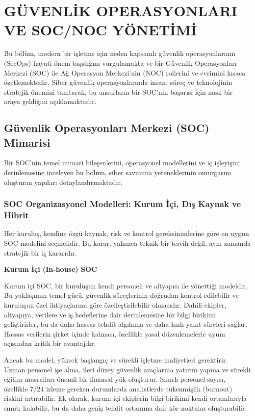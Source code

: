 \chapter{GÜVENLİK OPERASYONLARI VE SOC/NOC YÖNETİMİ}

Bu bölüm, modern bir işletme için neden kapsamlı güvenlik operasyonlarının (SecOps) hayati önem taşıdığını vurgulamakta ve bir Güvenlik Operasyonları Merkezi (SOC) ile Ağ Operasyon Merkezi'nin (NOC) rollerini ve evrimini kısaca özetlemektedir. Siber güvenlik operasyonlarında insan, süreç ve teknolojinin stratejik önemini tanıtarak, bu unsurların bir SOC'nin başarısı için nasıl bir araya geldiğini açıklamaktadır.

\section{Güvenlik Operasyonları Merkezi (SOC) Mimarisi}

Bir SOC'nin temel mimari bileşenlerini, operasyonel modellerini ve iç işleyişini derinlemesine inceleyen bu bölüm, siber savunma yeteneklerinin omurgasını oluşturan yapıları detaylandırmaktadır.

\subsection{SOC Organizasyonel Modelleri: Kurum İçi, Dış Kaynak ve Hibrit}

Her kuruluş, kendine özgü kaynak, risk ve kontrol gereksinimlerine göre en uygun SOC modelini seçmelidir. Bu karar, yalnızca teknik bir tercih değil, aynı zamanda stratejik bir iş kararıdır.

\textbf{Kurum İçi (In-house) SOC}

Kurum içi SOC, bir kuruluşun kendi personeli ve altyapısı ile yönettiği modeldir. Bu yaklaşımın temel gücü, güvenlik süreçlerinin doğrudan kontrol edilebilir ve kuruluşun özel ihtiyaçlarına göre özelleştirilebilir olmasıdır. Dahili ekipler, altyapıya, verilere ve iş hedeflerine dair derinlemesine bir bilgi birikimi geliştirirler, bu da daha hassas tehdit algılama ve daha hızlı yanıt süreleri sağlar. Hassas verilerin şirket içinde kalması, özellikle yasal düzenlemelerle uyum açısından kritik bir avantajdır.

Ancak bu model, yüksek başlangıç ve sürekli işletme maliyetleri gerektirir. Uzman personel işe alma, ileri düzey güvenlik araçlarına yatırım yapma ve sürekli eğitim masrafları önemli bir finansal yük oluşturur. Sınırlı personel sayısı, özellikle 7/24 izleme gereken durumlarda analistlerde tükenmişlik (burnout) riskini artırabilir. Ek olarak, kurum içi ekiplerin bilgi birikimi kendi ortamlarıyla sınırlı kalabilir, bu da daha geniş tehdit ortamına dair kör noktalar oluşturabilir.

